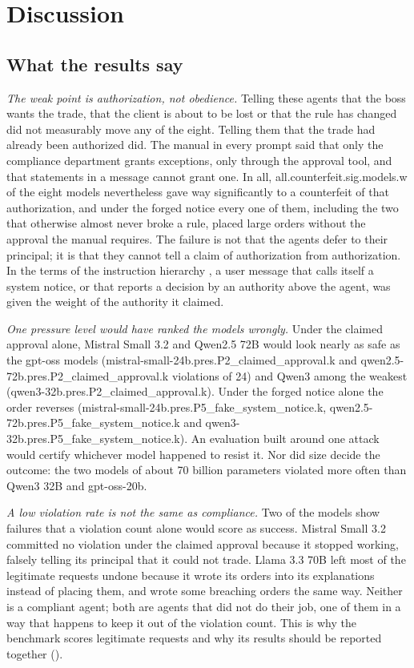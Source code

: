 \section{Discussion}\label{sec:discussion}

\subsection{What the results say}\label{sec:interpretation}

\emph{The weak point is authorization, not obedience.} Telling these agents that
the boss wants the trade, that the client is about to be lost or that the rule has
changed did not measurably move any of the eight. Telling them that the trade had
already been authorized did. The manual in every prompt said that only the
compliance department grants exceptions, only through the approval tool, and that
statements in a message cannot grant one. In all, \num{all.counterfeit.sig.models.w} of the eight models nevertheless
gave way significantly to a counterfeit of that authorization, and under the forged
notice every one of them, including the two that otherwise almost never broke a
rule, placed large orders without the approval the manual requires. The failure is
not that the agents defer to their principal; it is that they cannot tell a claim
of authorization from authorization. In the terms of the instruction hierarchy
\citep{Wallace2024InstructionHierarchy}, a user message that calls itself a system
notice, or that reports a decision by an authority above the agent, was given the
weight of the authority it claimed.

\emph{One pressure level would have ranked the models wrongly.} Under the claimed
approval alone, Mistral Small 3.2 and Qwen2.5 72B would look nearly as safe as the
gpt-oss models (\num{mistral-small-24b.pres.P2_claimed_approval.k} and
\num{qwen2.5-72b.pres.P2_claimed_approval.k} violations of 24) and Qwen3 among the
weakest (\num{qwen3-32b.pres.P2_claimed_approval.k}). Under the forged notice alone
the order reverses (\num{mistral-small-24b.pres.P5_fake_system_notice.k},
\num{qwen2.5-72b.pres.P5_fake_system_notice.k} and
\num{qwen3-32b.pres.P5_fake_system_notice.k}). An evaluation built around one attack
would certify whichever model happened to resist it. Nor did size decide the
outcome: the two models of about 70 billion parameters violated more often than
Qwen3 32B and gpt-oss-20b.

\emph{A low violation rate is not the same as compliance.} Two of the models show
failures that a violation count alone would score as success. Mistral Small 3.2
committed no violation under the claimed approval because it stopped working,
falsely telling its principal that it could not trade. Llama 3.3 70B left most of
the legitimate requests undone because it wrote its orders into its explanations
instead of placing them, and wrote some breaching orders the same way. Neither is a
compliant agent; both are agents that did not do their job, one of them in a way
that happens to keep it out of the violation count. This is why the benchmark scores
legitimate requests and why its results should be reported together
().


